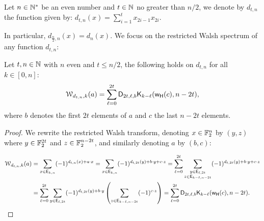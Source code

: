 \documentclass[11pt]{llncs}
\begin{document}
\begin{definition}
	Let $n\in \mathbb{N}^*$ be an even number and $t \in \mathbb{N} $ no greater than $n/2$, we denote by $d_{t,n}$ the function given by: $d_{t,n}(x)=\sum_{i=1}^t x_{2i-1} x_{2i}$.
	
\end{definition}

In particular, $d_{\frac{n}{2},n}(x)=d_n(x)$. 
We focus on the restricted Walsh spectrum of any function $d_{t,n}$:

\begin{proposition}\label{proposition:dtn}
	Let $t, n\in \mathbb{N}$ with $n$ even and $t\le n/2$, the following holds on $d_{t,n}$ for all $k\in [0,n]$:
	\[\mathcal{W}_{d_{t,n},k}(a)=\sum_{\ell=0}^{2t} \mathsf{D}_{2t,\ell,b} \mathsf{K}_{k-\ell}(\mathsf{w_H}(c),n-2t),\]
	where $b$ denotes the first $2t$ elements of $a$ and $c$ the last $n-2t$ elements.
\end{proposition}
\begin{proof}
	We rewrite the restricted Walsh transform, denoting $x\in \mathbb{F}_2^n$ by $(y,z)$ where $y\in \mathbb{F}_2^{2t}$ and $z \in \mathbb{F}_2^{n-2t}$, and similarly denoting $a$ by $(b,c)$:
	

	\begin{align*}
\wtk{d_{t,n}}{k}(a)&=\sum_{x \in \Ekn{k}{n}} (-1)^{d_{t,n}(x)+a \cdot x}=\sum_{x \in \Ekn{k}{n}} (-1)^{d_{t,2t}(y)+b \cdot y +c \cdot z}=\sum_{\ell=0}^{2t} \sum_{\substack{y \in \Ekn{\ell}{2t}\\z \in \Ekn{k-\ell}{n-2t}}} (-1)^{d_{t,2t}(y)+b \cdot y +c \cdot z}\\
&=\sum_{\ell=0}^{2t} \sum_{y \in \Ekn{\ell}{2t}} (-1)^{d_{t,2t}(y)+b \cdot y} \left( \sum_{z \in \Ekn{k-\ell}{n-2t}} (-1)^{c \cdot z}\right)=\sum_{\ell=0}^{2t} \Dnka{2t}{\ell}{b} \kraw{k-\ell}{\w(c)}{n-2t}.%
\end{align*}	



\end{proof}
\end{document}
